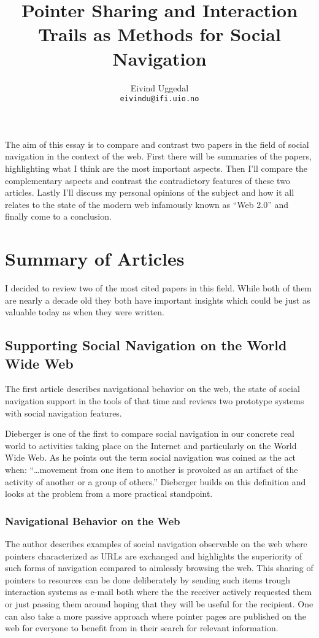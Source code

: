 \documentclass[12pt,a4paper]{article}
\title{Pointer Sharing and Interaction Trails
       as Methods for Social Navigation}
\author{Eivind Uggedal\\
        \texttt{eivindu@ifi.uio.no}}
\date{}
\begin{document}
\maketitle{}

The aim of this essay is to compare and contrast two papers in the field of
social navigation in the context of the web. First there will be summaries
of the papers, highlighting what I think are the most important aspects.
Then I'll compare the complementary aspects and contrast the contradictory
features of these two articles. Lastly I'll discuss my personal
opinions of the subject and how it all relates to the state of the modern web
infamously known as ``Web 2.0'' and finally come to a conclusion.

\section{Summary of Articles}

I decided to review two of the most cited papers in this field. While both of
them are nearly a decade old they both have important insights which could be
just as valuable today as when they were written.

\subsection{Supporting Social Navigation on the World Wide Web}
The first article \cite{dieberger97} describes navigational behavior on the
web, the state of social navigation support in the tools of that time and
reviews two prototype systems with social navigation features.

Dieberger is one of the first to compare social navigation in our concrete
real world to activities taking place on the Internet and particularly on the
World Wide Web. As he points out the term social navigation was coined as the
act when:
``\ldots movement from one item to another is provoked as an artifact of the
activity of another or a group of others.'' \cite{dourish94} Dieberger builds
on this definition and looks at the problem from a more practical standpoint.

\subsubsection{Navigational Behavior on the Web}

The author describes examples of social navigation observable on the web where
pointers characterized as URLs are exchanged and highlights the superiority of
such forms of navigation compared to aimlessly browsing the web. This sharing
of pointers to resources can be done deliberately by sending such
items trough interaction systems as e-mail both where the the receiver
actively requested them or just passing them around hoping that they
will be useful for the recipient. One can also take a more passive approach
where pointer pages are published on the web for everyone to benefit from in
their search for relevant information.
\end{document}

